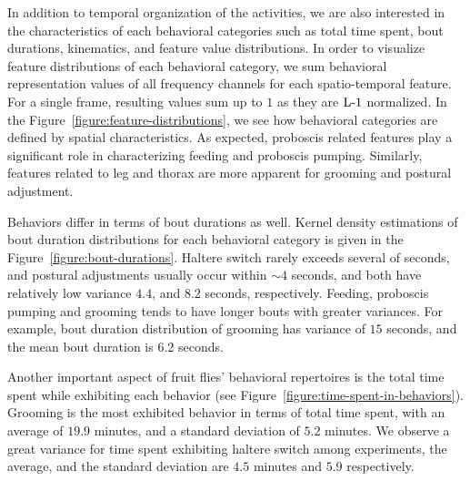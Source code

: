 In addition to temporal organization of the activities, we are also interested in the characteristics of each behavioral categories such as total time spent, bout durations, kinematics, and feature value distributions.
In order to visualize feature distributions of each behavioral category, we sum behavioral representation values of all frequency channels for each spatio-temporal feature.
For a single frame, resulting values sum up to $1$ as they are $\textnormal{L-}1$ normalized.
In the Figure~\ref{figure:feature-distributions}, we see how behavioral categories are defined by spatial characteristics.
As expected, proboscis related features play a significant role in characterizing feeding and proboscis pumping.
Similarly, features related to leg and thorax are more apparent for grooming and postural adjustment.

Behaviors differ in terms of bout durations as well.
Kernel density estimations of bout duration distributions for each behavioral category is given in the Figure~\ref{figure:bout-durations}.
Haltere switch rarely exceeds several of seconds, and postural adjustments usually occur within ${\sim}4$ seconds, and both have relatively low variance $4.4$, and $8.2$ seconds, respectively.
Feeding, proboscis pumping and grooming tends to have longer bouts with greater variances.
For example, bout duration distribution of grooming has variance of $15$ seconds, and the mean bout duration is $6.2$ seconds.

Another important aspect of fruit flies' behavioral repertoires is the total time spent while exhibiting each behavior (see Figure~\ref{figure:time-spent-in-behaviors}).
Grooming is the most exhibited behavior in terms of total time spent, with an average of $19.9$ minutes, and a standard deviation of $5.2$ minutes.
We observe a great variance for time spent exhibiting haltere switch among experiments, the average, and the standard deviation are $4.5$ minutes and $5.9$ respectively.


